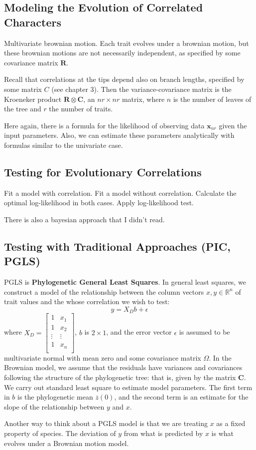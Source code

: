 \documentclass{article}
\newcommand{\1}[1]{\textbf{1}_{\left[#1\right]}} %
\def\R{\mathbb{R}} %
\begin{document}
\subsection{Modeling the Evolution of Correlated Characters}
Multivariate brownian motion. Each trait evolves under a brownian motion, but
these brownian motions are not necessarily independent, as specified by some
covariance matrix $\mathbf{R}$.

Recall that correlations at the tips depend also on branch lengths, specified by
some matrix $C$ (see chapter 3). Then the variance-covariance matrix is the
Kroeneker product $\mathbf{R}\otimes \mathbf{C}$, an $nr\times nr$ matrix, where
$n$ is the number of leaves of the tree and $r$ the number of traits.

Here again, there is a formula for the likelihood of observing data
$\mathbf{x}_{nr}$ given the input parameters. Also, we can estimate these
parameters analytically with formulas similar to the univariate case.

\subsection{Testing for Evolutionary Correlations}
Fit a model with correlation. Fit a model without correlation. Calculate the
optimal log-likelihood in both cases. Apply log-likelihood test.

There is also a bayesian approach that I didn't read.

\subsection{Testing with Traditional Approaches (PIC, PGLS)}

PGLS is \textbf{Phylogenetic General Least Squares}. In general least squares,
we construct a model of the relationship between the column vectors
$x,y\in \R^{n}$ of trait values and the whose correlation we wish to test:
\begin{equation*}
  y = X_{D}b + \epsilon
\end{equation*}
where
$X_{D} = \begin{bmatrix} 1 & x_1 \\ 1 & x_2 \\ \vdots & \vdots \\ 1 & x_n
  \\ \end{bmatrix}$, $b$ is $2\times 1$, and the error vector $\epsilon$ is
assumed to be multivariate normal with mean zero and some covariance matrix
$\Omega$. In the Brownian model, we assume that the residuals have variances and
covariances following the structure of the phylogenetic tree: that is, given by
the matrix $\mathbf{C}$. We carry out standard least square to estimate model
parameters. The first term in $b$ is the phylogenetic mean $\overline{z}(0)$,
and the second term is an estimate for the slope of the relationship between $y$
and $x$.

Another way to think about a PGLS model is that we are treating $x$ as a fixed
property of species. The deviation of $y$ from what is predicted by $x$ is what
evolves under a Brownian motion model.
\end{document}
